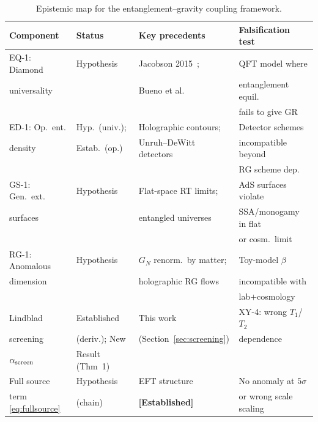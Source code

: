 \documentclass[12pt,letterpaper]{article}
\theoremstyle{definition}
\theoremstyle{remark}
\newcommand{\established}{\textbf{[Established]}}
\newcommand{\ascreen}{\alpha_{\rm screen}}
\begin{document}
\begin{table}[htbp]
\centering
\caption{Epistemic map for the entanglement--gravity coupling framework.}
\label{tab:epistemic}
\renewcommand{\arraystretch}{1.35}
\begin{tabular}{@{}L{2.8cm}L{2.5cm}L{3.2cm}L{3.2cm}@{}}
\toprule
Component & Status & Key precedents & Falsification test \\
\midrule
EQ-1: Diamond & Hypothesis & Jacobson 2015~\cite{jacobson2016}; & QFT model where \\
universality  &           & Bueno et al.~\cite{bueno2017}    & entanglement equil.\\
              &           &                                   & fails to give GR \\[2pt]
ED-1: Op.~ent. & Hyp.~(univ.); & Holographic contours; & Detector schemes \\
density       & Estab.~(op.) & Unruh--DeWitt detectors & incompatible beyond \\
              &              &                          & RG scheme dep. \\[2pt]
GS-1: Gen.~ext.& Hypothesis & Flat-space RT limits;    & AdS surfaces violate \\
surfaces       &            & entangled universes       & SSA/monogamy in flat \\
               &            &                           & or cosm.~limit \\[2pt]
RG-1: Anomalous & Hypothesis & $G_N$ renorm.~by matter; & Toy-model $\beta$ \\
dimension      &            & holographic RG flows      & incompatible with \\
               &            &                           & lab$+$cosmology \\[2pt]
Lindblad        & Established & This work               & XY-4: wrong $T_1$/$T_2$ \\
screening       & (deriv.); New & (Section~\ref{sec:screening}) & dependence \\
$\ascreen$      & Result (Thm~1) &                      & \\[2pt]
Full source     & Hypothesis  & EFT structure           & No anomaly at $5\sigma$ \\
term \eqref{eq:fullsource} & (chain) & \established{}   & or wrong scale scaling \\
\bottomrule
\end{tabular}
\end{table}
\end{document}
